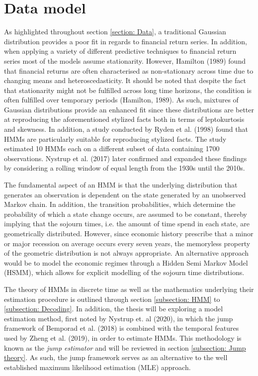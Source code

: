 \newpage
 \section{Data model}
As highlighted throughout section \ref{section: Data}, a traditional Gaussian distribution provides a poor fit in regards to financial return series. In addition, when applying a variety of different predictive techniques to financial return series most of the models assume stationarity. However, Hamilton (1989) found that financial returns are often characterised as non-stationary across time due to changing means and heteroscedasticity. It should be noted that despite the fact that stationarity might not be fulfilled across long time horizons, the condition is often fulfilled over temporary periods (Hamilton, 1989). As such, mixtures of Gaussian distributions provide an enhanced fit since these distributions are better at reproducing the aforementioned stylized facts both in terms of leptokurtosis and skewness. In addition, a study conducted by Ryden et al. (1998) found that HMMs are particularly suitable for reproducing stylized facts. The study estimated 10 HMMs each on a different subset of data containing 1700 observations. Nystrup et al. (2017) later confirmed and expanded these findings by considering a rolling window of equal length from the 1930s until the 2010s.

The fundamental aspect of an HMM is that the underlying distribution that generates an observation is dependent on the state generated by an unobserved Markov chain. In addition, the transition probabilities, which determine the probability of which a state change occurs, are assumed to be constant, thereby implying that the sojourn times, i.e. the amount of time spend in each state, are geometrically distributed. However, since economic history prescribe that a minor or major recession on average occurs every seven years, the memoryless property of the geometric distribution is not always appropriate. An alternative approach would be to model the economic regimes through a Hidden Semi Markov Model (HSMM), which allows for explicit modelling of the sojourn time distributions. 

The theory of HMMs in discrete time as well as the mathematics underlying their estimation procedure is outlined through section \ref{subsection: HMM} to \ref{subsection: Decoding}. In addition, the thesis will be exploring a model estimation method, first noted by Nystrup et. al (2020), in which the jump framework of Bemporad et al. (2018) is combined with the temporal features used by Zheng et al. (2019), in order to estimate HMMs. This methodology is known as the \textit{jump estimator} and will be reviewed in section \ref{subsection: Jump theory}. As such, the jump framework serves as an alternative to the well established maximum likelihood estimation (MLE) approach. 


